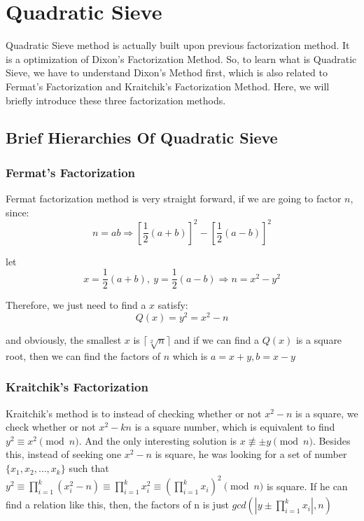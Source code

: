 \documentclass[12pt]{article} %
\begin{document}
	
	\section{Quadratic Sieve}
	
	Quadratic Sieve method is actually built upon previous factorization method. It is a optimization of Dixon's Factorization Method. So, to learn what is Quadratic Sieve, we have to understand Dixon's Method first, which is also related to Fermat's Factorization and Kraitchik's Factorization Method. Here, we will briefly introduce these three factorization methods.
	
	\subsection {Brief Hierarchies Of Quadratic Sieve}
	
	\subsubsection {Fermat's Factorization}
	Fermat factorization method is very straight forward, if we are going to factor $n$, since: $$n = ab \Rightarrow \left [\frac{1}{2}(a+b) \right ]^{2} - \left [\frac{1}{2}(a-b) \right ]^{2}$$
	
	let $$ x= \frac{1}{2}(a+b),\ y= \frac{1}{2}(a-b) \Rightarrow n = x^2 - y^2$$ 
	
	Therefore, we just need to find a $x$ satisfy: $$Q(x) = y^2 = x^2 - n$$ 
	
	and obviously, the smallest $x$ is $\lceil \sqrt[2]{n}\rceil$ and if we can find a $Q(x)$ is a square root, then we can find the factors of $n$ which is $a=x+y, b=x-y$
	
	\subsubsection {Kraitchik's Factorization}
	Kraitchik's method is to instead of checking whether or not $x^2-n$ is a square, we check whether or not $x^2 - kn$ is a square number, which is equivalent to find $y^2 \equiv x^2 \pmod{n} $. And the only interesting solution is $ x \not\equiv \pm y \pmod{n}$. Besides this, instead of seeking one $x^2-n$ is square, he was looking for a set of number $ \{x_1, x_2, \dots, x_k\} $ such that $\displaystyle y^2 \equiv \prod_{i=1}^k{(x_i^2 - n)} \equiv \prod_{i=1}^k{x_i^2} \equiv \left (\prod_{i=1}^k{x_i}\right)^2 \pmod{n} $ is square. If he can find a relation like this, then, the factors of n is just $\displaystyle gcd(|y \pm \prod_{i=1}^k{x_i}|, n)$
	
\end{document}
